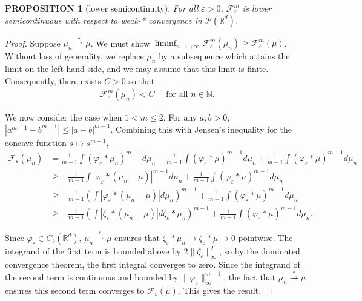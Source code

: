 \documentclass[11pt,leqno]{amsart}
\newtheorem{prop}[thm]{PROPOSITION}
\theoremstyle{definition}
\newcommand{\Rd}{{\mathord{\mathbb R}^d}}
\newcommand{\wsto}{\stackrel{*}{\rightharpoonup}}
\newcommand{\F}{\mathcal{F}}
\def\P{{\mathcal P}}
\def\e{\varepsilon}
\def\F{\mathcal{F}}
\begin{document}
\begin{prop}[lower semicontinuity] \label{lower semicontinuity}
For all $\e >0$, $\F^m_\e$ is lower semicontinuous with respect to weak-* convergence in $\P(\Rd)$.
\end{prop}
\begin{proof}
Suppose $\mu_n \wsto \mu$. We must show $\liminf_{n \to +\infty} \F^m_\e(\mu_n) \geq \F^m_\e(\mu)$. Without loss of generality, we replace $\mu_n$ by a subsequence which attains the limit on the left hand side, and we may assume that this limit is finite. Consequently, there exists $C>0$ so that 
\begin{align} \label{lower semicty ineq 0} 
\F^m_\e(\mu_n) < C \quad \text{ for all } n \in \mathbb{N} .
\end{align}

We now consider the case when $1 < m \leq 2$. For any $a,b >0$, $|a^{m-1} -b^{m-1}| \leq |a-b|^{m-1}$. Combining this with Jensen's inequality for the concave function $s\mapsto s^{m-1}$,
\begin{align} \label{lower semicty ineq 1}
 \F_\e(\mu_n) &= \frac{1}{m-1} \int (\varphi_\e *\mu_n)^{m-1} d \mu_n - \frac{1}{m-1} \int (\varphi_\e *\mu)^{m-1} d \mu_n + \frac{1}{m-1} \int (\varphi_\e *\mu)^{m-1} d \mu_n   \\
&\geq - \frac{1}{m-1} \int |\varphi_\e *(\mu_n - \mu)|^{m-1} d \mu_n +  \frac{1}{m-1} \int (\varphi_\e *\mu)^{m-1} d \mu_n \nonumber \\
&\geq - \frac{1}{m-1} \left(  \int |\varphi_\e *(\mu_n - \mu)| d \mu_n \right)^{m-1} +  \frac{1}{m-1} \int (\varphi_\e *\mu)^{m-1} d \mu_n \nonumber \\
&\geq - \frac{1}{m-1} \left(  \int |\zeta_\e *(\mu_n - \mu)| d \zeta_\e*\mu_n \right)^{m-1} +  \frac{1}{m-1} \int (\varphi_\e *\mu)^{m-1} d \mu_n . \nonumber
 \end{align}

 Since $\varphi_\e \in C_b(\Rd)$, $\mu_n \wsto \mu$ ensures that $\zeta_\e * \mu_n \to \zeta_\e* \mu \to 0$ pointwise. The integrand of the first term is bounded above by $2\|\zeta_\e\|_\infty^2$, so by the dominated convergence theorem, the first integral converges to zero. Since the integrand of the second term is continuous and bounded by $\|\varphi_\e\|_\infty^{m-1}$, the fact that $\mu_n \wsto \mu$ ensures this second term converges to $\F_\e(\mu)$. This gives the result.


\end{proof}
\end{document}
